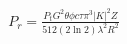 \documentclass[preview]{standalone}
\begin{document}
\begin{align*}
P_r = \frac{P_t G^2 \theta \phi c \tau \pi^3 \lvert K \rvert^2 Z}{512 (2 \ln{2}) \lambda^2 R^2}
\end{align*}
\end{document}
